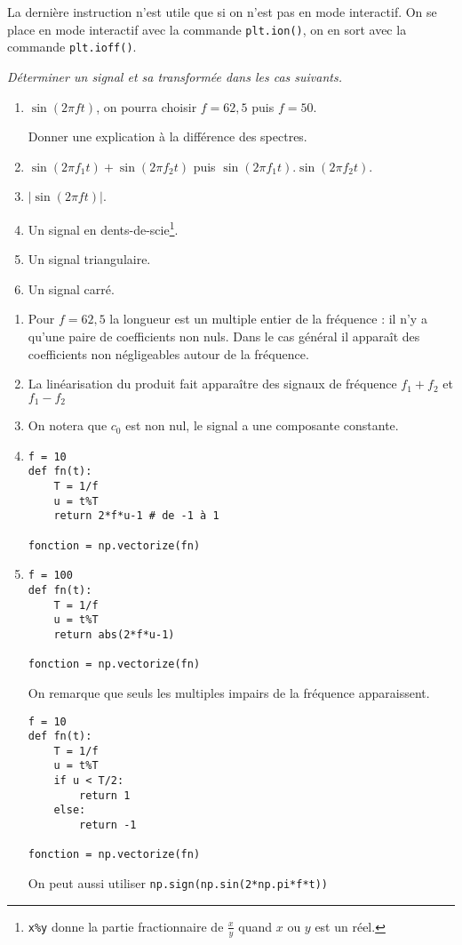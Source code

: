 La dernière instruction n'est utile que si on n'est pas en mode interactif. On se place en mode interactif avec la commande {\tt plt.ion()}, on en sort avec la commande {\tt plt.ioff()}.
\begin{Exercise}\it Déterminer un signal et sa transformée dans les cas suivants.
\begin{enumerate}
  \item $\sin(2\pi f t)$, on pourra choisir $f=62,5$ puis $f=50$.

  Donner une explication à la différence des spectres.
  \item $\sin(2\pi f_1 t) + \sin(2\pi f_2 t)$ puis $\sin(2\pi f_1 t).\sin(2\pi f_2 t)$.
  \item $|\sin(2\pi f t)|$.
  \item Un signal en dents-de-scie\footnote{{\tt x\%y} donne la partie fractionnaire de $\frac xy$ quand $x$ ou $y$ est un réel.}.
  \item Un signal triangulaire.
  \item Un signal carré.
  \end{enumerate}
\end{Exercise}
\begin{Answer}
\begin{enumerate}
  \item Pour $f=62,5$ la longueur est un multiple entier de la fréquence : il n'y a qu'une paire de coefficients non nuls. Dans le cas général il apparaît des coefficients non négligeables autour de la fréquence.
  \item La linéarisation du produit fait apparaître des signaux de fréquence $f_1+f_2$ et $f_1-f_2$
  \item On notera que $c_0$ est non nul, le signal a une composante constante.
\item
\begin{lstlisting}
f = 10
def fn(t):
    T = 1/f
    u = t%T
    return 2*f*u-1 # de -1 à 1

fonction = np.vectorize(fn)
\end{lstlisting}

\item
\begin{lstlisting}
f = 100
def fn(t):
    T = 1/f
    u = t%T
    return abs(2*f*u-1)

fonction = np.vectorize(fn)
\end{lstlisting}

On remarque que seuls les multiples impairs de la fréquence apparaissent.
\begin{lstlisting}
f = 10
def fn(t):
    T = 1/f
    u = t%T
    if u < T/2:
        return 1
    else:
        return -1

fonction = np.vectorize(fn)
\end{lstlisting}

On peut aussi utiliser {\tt np.sign(np.sin(2*np.pi*f*t))}

  \end{enumerate}
\end{Answer}
